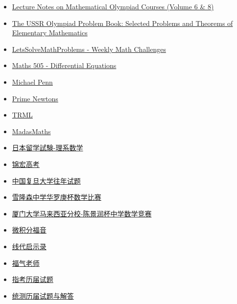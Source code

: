 \documentclass[12pt]{exam}
\begin{document}
\begin{multicols}{2}
\begin{itemize}
    \item \href{https://www.worldscientific.com/series/MOS}{Lecture Notes on Mathematical Olympiad Courses (Volume 6 \& 8)}
    \item \href{https://www.isinj.com/mt-usamo/USSR%20Olympiad%20Problem%20Book%20(The)%20-%20Shklasrsky,%20Chentzov,%20and%20Yaglom%20(1993,%20Dover)%20(1-1).pdf}{The USSR Olympiad Problem Book: Selected Problems and Theorems of Elementary Mathematics}
    \item \href{https://www.youtube.com/@LetsSolveMathProblems}{LetsSolveMathProblems - Weekly Math Challenges}
    \item \href{https://www.youtube.com/@maths_505}{Maths 505 - Differential Equations}
    \item \href{https://www.youtube.com/@MichaelPennMath}{Michael Penn}
    \item \href{https://www.youtube.com/@PrimeNewtons}{Prime Newtons}
    \item \href{https://www.cpshs.hcc.edu.tw/resource/openfid.php?id=2000}{TRML}
    \item \href{https://madasmaths.com/archive_maths_booklets_standard_topics_integration.html}{MadasMaths}
    \item \href{https://www.densu.jp/libs.htm}{日本留学試験-理系数学}
    \item \href{https://jhcee.cn/pc/gk_information/consultation_detail-d6278da9-0614-42f2-b955-956d684bd64c.html}{锦宏高考}
    \item \href{https://math.fudan.edu.cn/gdsx/34379/list.htm}{中国复旦大学往年试题}
    \item \href{https://www.newera.edu.my/competition/hua_lo_geng/ch/passyear.php}{雪隆森中学华罗庚杯数学比赛}
    \item \href{https://mathcompetition.wixsite.com/chenjingrun}{厦门大学马来西亚分校-陈景润杯中学数学竞赛}
    \item \href{https://calcgospel.top/2023/%e5%85%a9%e7%a8%ae%e9%87%8d%e8%a6%81%e6%a5%b5%e9%99%90%e6%b7%b7%e5%90%88%e7%9a%84%e6%a5%b5%e9%99%90%e9%a1%8c/}{微积分福音}
    \item \href{https://ccjou.wordpress.com/category/%e7%b7%9a%e6%80%a7%e4%bb%a3%e6%95%b8%e5%b0%88%e6%ac%84/linear-equations/}{线代启示录}
    \item \href{http://cfc.ehosting.com.tw/LT_C/course_3_4.html}{福气老师}    
    \item \href{https://www.ceec.edu.tw/xmfile?xsmsid=0J052427633128416650&page=14}{指考历届试题}
    \item \href{http://library.yuda-cloudstudy.com.tw/submenu/index/old-exam}{统测历届试题与解答}

\end{itemize}
\end{multicols}
\end{document}
